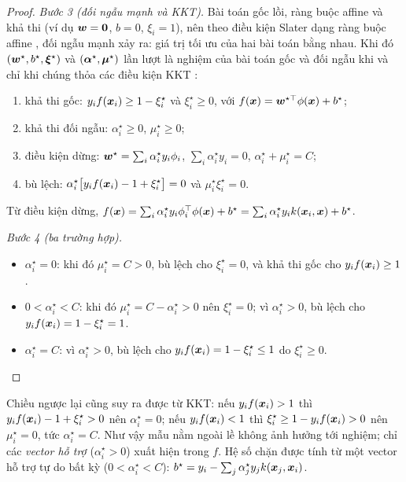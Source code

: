 \begin{proof}
\emph{Bước 3 (đối ngẫu mạnh và KKT).} Bài toán gốc lồi, ràng buộc affine và khả thi
(ví dụ $\bm{w} = \bm{0}$, $b = 0$, $\xi_i = 1$), nên theo điều kiện Slater dạng ràng buộc affine
\citep[Mục 5.2.3]{boyd2004convex}, đối ngẫu mạnh xảy ra: giá trị tối ưu của hai bài toán bằng nhau.
Khi đó $(\bm{w}^\star, b^\star, \bm{\xi}^\star)$ và $(\bm{\alpha}^\star, \bm{\mu}^\star)$ lần lượt là nghiệm
của bài toán gốc và đối ngẫu khi và chỉ khi chúng thỏa các điều kiện KKT
\citep[Mục 5.5.3]{boyd2004convex}:
\begin{enumerate}
  \item khả thi gốc: $y_i f(\bm{x}_i) \ge 1 - \xi_i^\star$ và $\xi_i^\star \ge 0$,
        với $f(\bm{x}) = \bm{w}^{\star\top}\phi(\bm{x}) + b^\star$;
  \item khả thi đối ngẫu: $\alpha_i^\star \ge 0$, $\mu_i^\star \ge 0$;
  \item điều kiện dừng: $\bm{w}^\star = \sum_i \alpha_i^\star y_i \phi_i$, $\sum_i \alpha_i^\star y_i = 0$,
        $\alpha_i^\star + \mu_i^\star = C$;
  \item bù lệch: $\alpha_i^\star\bigl[y_i f(\bm{x}_i) - 1 + \xi_i^\star\bigr] = 0$ và $\mu_i^\star \xi_i^\star = 0$.
\end{enumerate}
Từ điều kiện dừng,
$f(\bm{x}) = \sum_i \alpha_i^\star y_i \phi_i^{\top}\phi(\bm{x}) + b^\star = \sum_i \alpha_i^\star y_i k(\bm{x}_i, \bm{x}) + b^\star$.

\emph{Bước 4 (ba trường hợp).}
\begin{itemize}
  \item $\alpha_i^\star = 0$: khi đó $\mu_i^\star = C > 0$, bù lệch cho $\xi_i^\star = 0$,
        và khả thi gốc cho $y_i f(\bm{x}_i) \ge 1$.
  \item $0 < \alpha_i^\star < C$: khi đó $\mu_i^\star = C - \alpha_i^\star > 0$ nên $\xi_i^\star = 0$;
        vì $\alpha_i^\star > 0$, bù lệch cho $y_i f(\bm{x}_i) = 1 - \xi_i^\star = 1$.
  \item $\alpha_i^\star = C$: vì $\alpha_i^\star > 0$, bù lệch cho
        $y_i f(\bm{x}_i) = 1 - \xi_i^\star \le 1$ do $\xi_i^\star \ge 0$. \qedhere
\end{itemize}
\end{proof}

\begin{remark}\label{rem:B2-kkt}
Chiều ngược lại cũng suy ra được từ KKT: nếu $y_i f(\bm{x}_i) > 1$ thì
$y_i f(\bm{x}_i) - 1 + \xi_i^\star > 0$ nên $\alpha_i^\star = 0$; nếu $y_i f(\bm{x}_i) < 1$ thì
$\xi_i^\star \ge 1 - y_i f(\bm{x}_i) > 0$ nên $\mu_i^\star = 0$, tức $\alpha_i^\star = C$.
Như vậy mẫu nằm ngoài lề không ảnh hưởng tới nghiệm; chỉ các \emph{vector hỗ trợ}
($\alpha_i^\star > 0$) xuất hiện trong $f$. Hệ số chặn được tính từ một vector hỗ trợ tự do
bất kỳ ($0 < \alpha_i^\star < C$): $b^\star = y_i - \sum_j \alpha_j^\star y_j k(\bm{x}_j, \bm{x}_i)$.
\end{remark}

